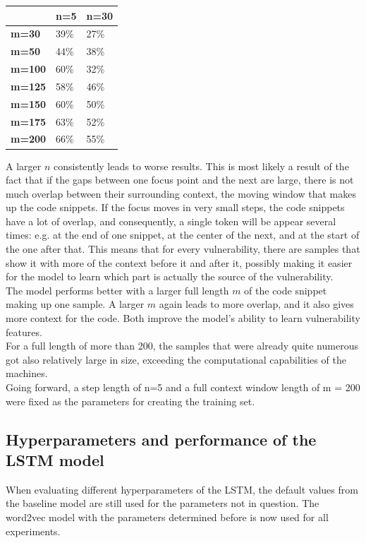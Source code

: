 \documentclass[
	a4paper,
	pagesize,
	pdftex,
	12pt,
	twoside, %
	BCOR=5mm, %
	ngerman,
	fleqn,
	final,
	]{scrartcl}
\begin{document}
\begin{tabular}{|p{2cm}||p{1.7cm}|p{1.7cm}|}
	\hline  
				& \textbf{n=5} & \textbf{n=30} \\
				\hline
	\textbf{m=30} & 39\%& 27\% \\ 
	\textbf{m=50} & 44\%& 38\% \\ 
	\textbf{m=100} & 60\%& 32\% \\
	\textbf{m=125} & 58\%&46\% \\
	\textbf{m=150} & 60\%& 50\% \\
	\textbf{m=175} & 63\%&52\% \\
	\textbf{m=200} & 66\%& 55\%\\
	\hline
	\hline
\end{tabular}

A larger $n$ consistently leads to worse results. This is most likely a result of the fact that if the gaps between one focus point and the next are large, there is not much overlap between their surrounding context, the moving window that makes up the code snippets. If the focus moves in very small steps, the code snippets have a lot of overlap, and consequently, a single token will be appear several times: e.g. at the end of one snippet, at the center of the next, and at the start of the one after that. This means that for every vulnerability, there are samples that show it with more of the context before it and after it, possibly making it easier for the model to learn which part is actually the source of the vulnerability.\\
The model performs better with a larger full length $m$ of the code snippet making up one sample. A larger $m$ again leads to more overlap, and it also gives more context for the code. Both improve the model's ability to learn vulnerability features. \\
For a full length of more than 200, the samples that were already quite numerous got also relatively large in size, exceeding the computational capabilities of the machines. \\
Going forward, a step length of n=5 and a full context window length of m = 200 were fixed as the parameters for creating the training set.

\subsection{Hyperparameters and performance of the LSTM model}

When evaluating different hyperparameters of the LSTM, the default values from the baseline model are still used for the parameters not in question. The word2vec model with the parameters determined before is now used for all experiments.
\end{document}
